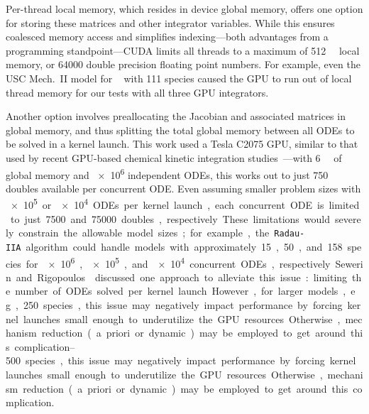 \documentclass[final,twocolumn]{elsarticle}
\begin{document}
Per-thread local memory, which resides in device global memory, offers one option for storing these matrices and other integrator variables.
While this ensures coalesced memory access and simplifies indexing---both advantages from a programming standpoint---CUDA limits all threads to a maximum of \SI{512}{\kilo\byte} local memory, or \num{64000} double precision floating point numbers.
For example, even the USC Mech.~II model for ~\cite{Wang:2007} with 111 species caused the GPU to run out of local thread memory for our tests with all three GPU integrators.

Another option involves preallocating the Jacobian and associated matrices in global memory, and thus splitting the total global memory between all ODEs to be solved in a kernel launch.
This work used a Tesla C2075 GPU, similar to that used by recent GPU-based chemical kinetic integration studies~\cite{Shi:2011aa,Niemeyer:2011aa,Shi:2012aa,Le2013596,Stone:2013aa,Niemeyer:2014aa}---with \SI{6}{\giga\byte} of global memory and \num{e6} independent ODEs, this works out to just 750 doubles available per concurrent ODE.
Even assuming smaller problem sizes with \SI{e5} or \SI{e4} ODEs per kernel launch, each concurrent ODE is limited to just \num{7500} and \num{75000} doubles, respectively.
These limitations would severely constrain the allowable model sizes; for example, the \texttt{Radau-IIA} algorithm could handle models with approximately 15, 50, and 158 species for \num{e6}, \num{e5}, and \num{e4} concurrent ODEs, respectively.
Sewerin and Rigopoulos~\cite{Sewerin20151375} discussed one approach to alleviate this issue: limiting the number of ODEs solved per kernel launch.
However, for larger models, e.g., \SIrange{250}{500} species, this issue may negatively impact performance by forcing kernel launches small enough to underutilize the GPU resources.
Otherwise, mechanism reduction (a priori or dynamic) may be employed to get around this complication.
\end{document}
